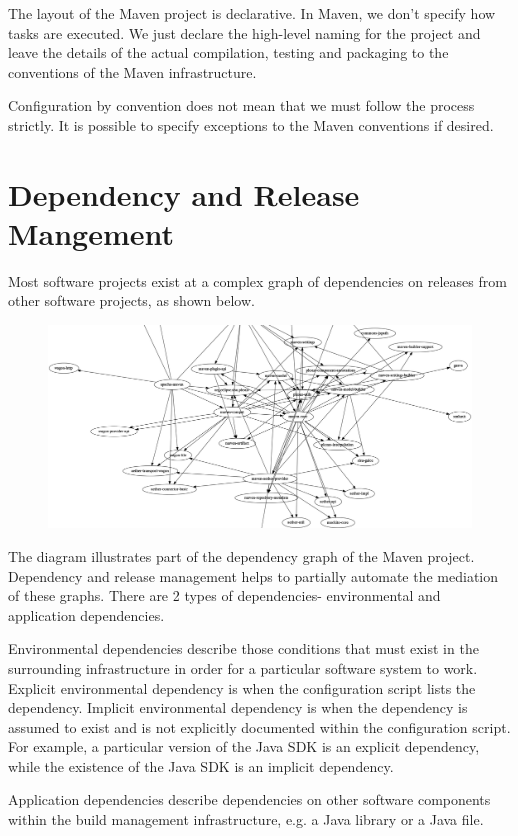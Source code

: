 \documentclass[a4paper, openany]{memoir}
\begin{document}
The layout of the Maven project is declarative. In Maven, we don't specify how tasks are executed. We just declare the high-level naming for the project and leave the details of the actual compilation, testing and packaging to the conventions of the Maven infrastructure.

Configuration by convention does not mean that we must follow the process strictly. It is possible to specify exceptions to the Maven conventions if desired.

\section{Dependency and Release Mangement}
Most software projects exist at a complex graph of dependencies on releases from other software projects, as shown below.
\begin{figure}[H]
    \centering
    \includegraphics[scale=0.22]{src/8.3 Dependency Graph.png}
\end{figure}
\noindent The diagram illustrates part of the dependency graph of the Maven project. Dependency and release management helps to partially automate the mediation of these graphs. There are 2 types of dependencies- environmental and application dependencies.

Environmental dependencies describe those conditions that must exist in the surrounding infrastructure in order for a particular software system to work. Explicit environmental dependency is when the configuration script lists the dependency. Implicit environmental dependency is when the dependency is assumed to exist and is not explicitly documented within the configuration script. For example, a particular version of the Java SDK is an explicit dependency, while the existence of the Java SDK is an implicit dependency.

Application dependencies describe dependencies on other software components within the build management infrastructure, e.g. a Java library or a Java file.
\end{document}
